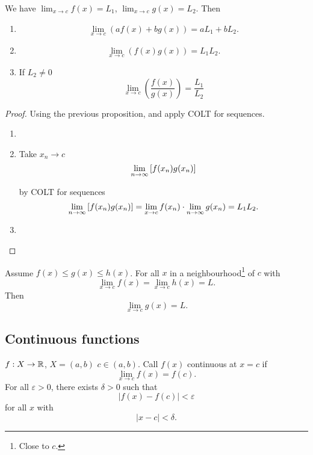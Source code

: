 \documentclass[10pt, a4paper]{article}
\begin{document}
\begin{proposition}[COLT]
    We have $\lim_{x \rightarrow c}f(x) = L_1$,
    $\lim_{x \rightarrow c}g(x) = L_2$.
    Then
    \begin{enumerate}[label = (\roman*)]
        \item
        \[
        \lim_{x \rightarrow c}(af(x) + bg(x)) = aL_1 + bL_2.
        \]

        \item
        \[
        \lim_{x \rightarrow c}(f(x)g(x)) = L_1L_2.
        \]

        \item If $L_2 \neq 0$
        \[
        \lim_{x \rightarrow c}\left(\frac{f(x)}{g(x)}\right) = \frac{L_1}{L_2}
        \]
    \end{enumerate}

    \begin{proof}
        Using the previous proposition,
        and apply COLT for sequences.
        \begin{enumerate}[label = (\roman*)]
            \item \phantom{}
            
            \item Take $x_n \rightarrow c$
            \[
            \lim_{n \rightarrow \infty}\left[f(x_n)g(x_n)\right]
            \]
            
            by COLT for sequences
            \[
            \lim_{n \rightarrow \infty}\left[f(x_n)g(x_n)\right] = \lim_{x \rightarrow c}f(x_n)\cdot\lim_{n \rightarrow \infty} g(x_n) = L_1L_2.
            \]
            
            \item \phantom{}
        \end{enumerate}
    \end{proof}
\end{proposition}

\begin{proposition}[Squeezing]
    Assume $f(x) \leq g(x) \leq h(x)$.
    For all $x$ in a neighbourhood\footnote{Close to $c$.} of $c$ with
    \[
    \lim_{x \rightarrow c}f(x) = \lim_{x \rightarrow c}h(x) = L.
    \]
    Then
    \[
    \lim_{x \rightarrow c}g(x) = L.
    \]
\end{proposition}

\subsection{Continuous functions}

\begin{definition}[Co]
    $f : X \rightarrow \mathbb{R}$,
    $X = (a, b)$
    $c \in (a, b)$.
    Call $f(x)$ continuous at $x = c$ if
    \[
    \lim_{x \rightarrow c}f(x) = f(c).
    \]
    For all $\varepsilon > 0$,
    there exists $\delta > 0$ such that
    \[
    |f(x) - f(c)| < \varepsilon
    \]
    for all $x$ with
    \[
    |x - c| < \delta.
    \]
\end{definition}
\end{document}
